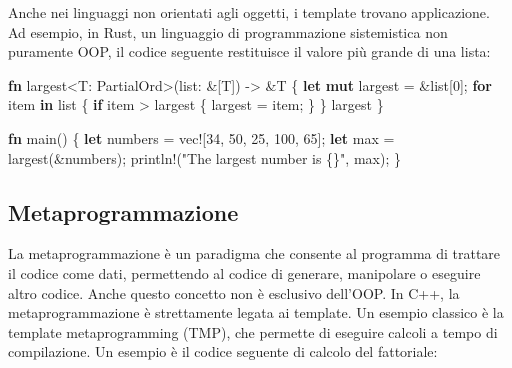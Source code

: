 \documentclass[
  letterpaper,
  DIV=11,
  numbers=noendperiod]{scrreprt}
\newenvironment{Shaded}{\begin{snugshade}}{\end{snugshade}}
\newcommand{\BuiltInTok}[1]{\textcolor[rgb]{0.00,0.23,0.31}{#1}}
\newcommand{\ControlFlowTok}[1]{\textcolor[rgb]{0.00,0.23,0.31}{\textbf{#1}}}
\newcommand{\DecValTok}[1]{\textcolor[rgb]{0.68,0.00,0.00}{#1}}
\newcommand{\KeywordTok}[1]{\textcolor[rgb]{0.00,0.23,0.31}{\textbf{#1}}}
\newcommand{\NormalTok}[1]{\textcolor[rgb]{0.00,0.23,0.31}{#1}}
\newcommand{\OperatorTok}[1]{\textcolor[rgb]{0.37,0.37,0.37}{#1}}
\newcommand{\PreprocessorTok}[1]{\textcolor[rgb]{0.68,0.00,0.00}{#1}}
\newcommand{\StringTok}[1]{\textcolor[rgb]{0.13,0.47,0.30}{#1}}
\begin{document}
Anche nei linguaggi non orientati agli oggetti, i template trovano
applicazione. Ad esempio, in Rust, un linguaggio di programmazione
sistemistica non puramente OOP, il codice seguente restituisce il valore
più grande di una lista:

\begin{Shaded}
\begin{Highlighting}[]
\KeywordTok{fn}\NormalTok{ largest}\OperatorTok{\textless{}}\NormalTok{T}\OperatorTok{:} \BuiltInTok{PartialOrd}\OperatorTok{\textgreater{}}\NormalTok{(list}\OperatorTok{:} \OperatorTok{\&}\NormalTok{[T]) }\OperatorTok{{-}\textgreater{}} \OperatorTok{\&}\NormalTok{T }\OperatorTok{\{}
    \KeywordTok{let} \KeywordTok{mut}\NormalTok{ largest }\OperatorTok{=} \OperatorTok{\&}\NormalTok{list[}\DecValTok{0}\NormalTok{]}\OperatorTok{;}
    \ControlFlowTok{for}\NormalTok{ item }\KeywordTok{in}\NormalTok{ list }\OperatorTok{\{}
        \ControlFlowTok{if}\NormalTok{ item }\OperatorTok{\textgreater{}}\NormalTok{ largest }\OperatorTok{\{}
\NormalTok{            largest }\OperatorTok{=}\NormalTok{ item}\OperatorTok{;}
        \OperatorTok{\}}
    \OperatorTok{\}}
\NormalTok{    largest}
\OperatorTok{\}}

\KeywordTok{fn}\NormalTok{ main() }\OperatorTok{\{}
    \KeywordTok{let}\NormalTok{ numbers }\OperatorTok{=} \PreprocessorTok{vec!}\NormalTok{[}\DecValTok{34}\OperatorTok{,} \DecValTok{50}\OperatorTok{,} \DecValTok{25}\OperatorTok{,} \DecValTok{100}\OperatorTok{,} \DecValTok{65}\NormalTok{]}\OperatorTok{;}
    \KeywordTok{let}\NormalTok{ max }\OperatorTok{=}\NormalTok{ largest(}\OperatorTok{\&}\NormalTok{numbers)}\OperatorTok{;}
    \PreprocessorTok{println!}\NormalTok{(}\StringTok{"The largest number is \{\}"}\OperatorTok{,}\NormalTok{ max)}\OperatorTok{;}
\OperatorTok{\}}
\end{Highlighting}
\end{Shaded}

\subsection{Metaprogrammazione}\label{metaprogrammazione}

La metaprogrammazione è un paradigma che consente al programma di
trattare il codice come dati, permettendo al codice di generare,
manipolare o eseguire altro codice. Anche questo concetto non è
esclusivo dell'OOP. In C++, la metaprogrammazione è strettamente legata
ai template. Un esempio classico è la template metaprogramming (TMP),
che permette di eseguire calcoli a tempo di compilazione. Un esempio è
il codice seguente di calcolo del fattoriale:
\end{document}
